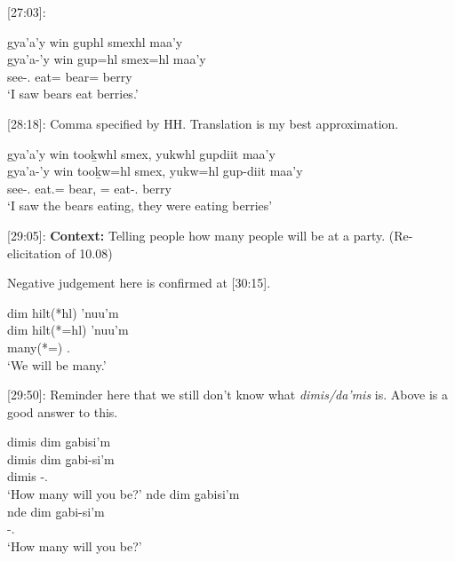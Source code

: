 [27:03]:

\begin{exe}
    \ex \glll gya'a'y win guphl smexhl maa'y \\
    gya'a-'y win gup=hl smex=hl maa'y \\
    see-\Fsg{}.\Ii{} \Comp{} eat=\Cn{} bear=\Cn{} berry  \\
    `I saw bears eat berries.'
\end{exe}

[28:18]: Comma specified by HH. Translation is my best approximation.

\begin{exe}
    \ex \glll gya'a'y win tooḵwhl smex, yukwhl gupdiit maa'y  \\
    gya'a-'y win tooḵw=hl smex, yukw=hl gup-diit maa'y  \\
    see-\Fsg{}.\Ii{} \Comp{} eat.\Pl{}=\Cn{} bear, \Prog{}=\Cn{} eat-\Tpl{}.\Ii{} berry  \\
    `I saw the bears eating, they were eating berries'
\end{exe}

[29:05]: \textbf{Context: }Telling people how many people will be at a party. (Re-elicitation of 10.08)

Negative judgement here is confirmed at [30:15].


\begin{exe}
    \ex \glll dim hilt(*hl) 'nuu'm  \\
    dim hilt(*=hl) 'nuu'm \\
    \Prosp{} many(*=\Cn{}) \Fpl{}.\Iii{}  \\
    `We will be many.'
\end{exe}

[29:50]: Reminder here that we still don't know what \textit{dimis/da'mis} is. Above is a good answer to this.

\begin{exe}
    \ex
    \begin{xlist}
    \item \glll dimis dim g̱abisi'm \\
    dimis dim g̱abi-si'm \\
    dimis \Prosp{} \Cnt{}-\Spl{}.\Ii{} \\
    `How many will you be?'
    \glll nde dim g̱abisi'm \\
    nde dim g̱abi-si'm \\
    \Wh{} \Prosp{} \Cnt{}-\Spl{}.\Ii{} \\
    `How many will you be?'
    \end{xlist}
\end{exe}


